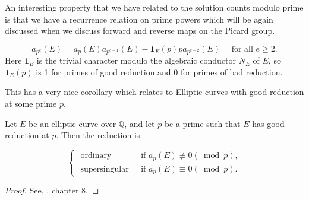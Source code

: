 An interesting property that we have related to the solution counts modulo prime is that we have a recurrence relation on prime powers which will be again discussed when we discuss forward and reverse maps on the Picard group. 

\begin{proposition}
    $$
a_{p^{e}}(E)=a_{p}(E) a_{p^{e-1}}(E)-\mathbf{1}_{E}(p) p a_{p^{e-2}}(E) \quad \text { for all } e \geq 2 .
$$
Here $\mathbf{1}_{E}$ is the trivial character modulo the algebraic conductor $N_{E}$ of $E$, so $\mathbf{1}_{E}(p)$ is 1 for primes of good reduction and 0 for primes of bad reduction. 
\end{proposition}

This has a very nice corollary which relates to Elliptic curves with good reduction at some prime $p$.

\begin{corollary}
    Let $E$ be an elliptic curve over $\mathbb{Q}$, and let $p$ be a prime such that $E$ has good reduction at $p$. Then the reduction is

$$
\begin{cases}\text { ordinary } & \text { if } a_{p}(E) \not \equiv 0(\bmod p), \\ \text { supersingular } & \text { if } a_{p}(E) \equiv 0(\bmod p) .\end{cases}
$$
\end{corollary}
\begin{proof}
    See, \cite{diamond2005first}, chapter 8.
\end{proof}

